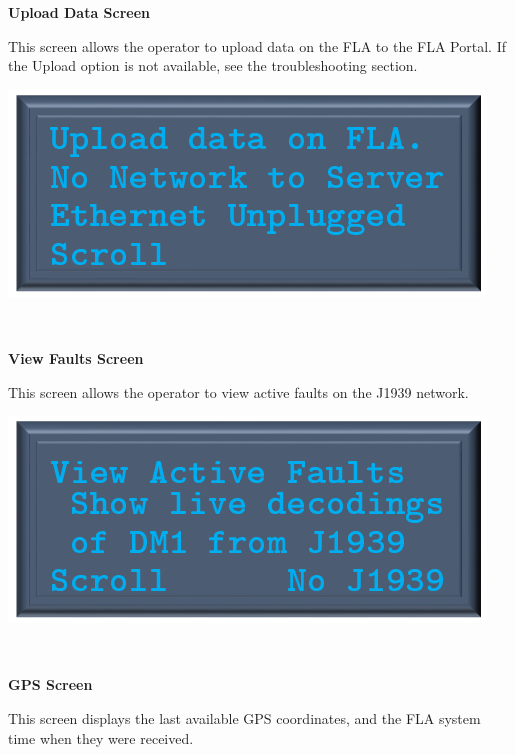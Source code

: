 \documentclass[11pt, oneside]{book}
\begin{document}
\noindent\begin{minipage}{0.45\textwidth}%
	\begin{center}
		\textbf{Upload Data Screen}
	\end{center}
  \label{subsec:upload_data}
	This screen allows the operator to upload data on the FLA to the FLA Portal.
	If the Upload option is not available, see the troubleshooting section.
\end{minipage}%
\hfill%
\begin{minipage}{0.45\textwidth} 
	\includegraphics[width=\linewidth]{../media/pstricks_files/03_upload_data_screen}
\end{minipage}\\[\baselineskip]
\noindent\begin{minipage}{0.45\textwidth}%
	\begin{center}
		\textbf{View Faults Screen}
	\end{center}
	This screen allows the operator to view active faults on the J1939 network.
\end{minipage}%
\hfill%
\begin{minipage}{0.45\textwidth} 
	\includegraphics[width=\linewidth]{../media/pstricks_files/04_view_active_faults}
\end{minipage}\\[\baselineskip]
\noindent\begin{minipage}{0.45\textwidth}%
	\begin{center}
		\textbf{GPS Screen}
	\end{center}
	This screen displays the last available GPS coordinates, and the FLA system time when they were received.
\end{minipage}%
\end{document}
